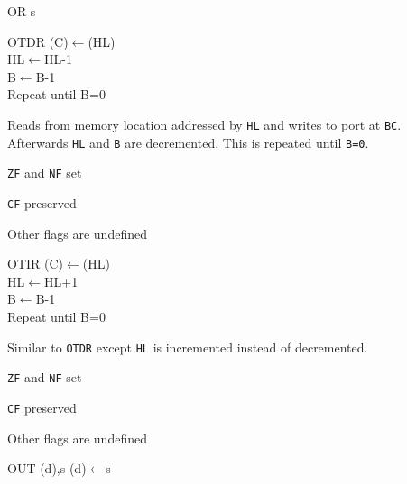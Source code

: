 \documentclass[twoside,openright,a4paper]{book}
\begin{document}
\begin{basedescript}{
	\desclabelstyle{\multilinelabel}
	\desclabelwidth{3cm}}
\begin{detailitem}{OR s}
	\end{detailitem}

	\begin{detailitem}{OTDR}
		{(C)$\leftarrow$(HL)\\
		HL$\leftarrow$HL-1\\
		B$\leftarrow$B-1\\
		Repeat until B=0}

		Reads from memory location addressed by {\tt HL} and writes to port at {\tt BC}. Afterwards {\tt HL} and {\tt B} are decremented. This is repeated until {\tt B=0}.

		\begin{DetailEffects}
			\item {\tt ZF} and {\tt NF} set
			\item {\tt CF} preserved
			\item Other flags are undefined
		\end{DetailEffects}
				
		\begin{DetailTiming}
		\end{DetailTiming}

	\end{detailitem}

	\pagebreak
	\begin{detailitem}{OTIR}
		{(C)$\leftarrow$(HL)\\
		HL$\leftarrow$HL+1\\
		B$\leftarrow$B-1\\
		Repeat until B=0}

		Similar to {\tt OTDR} except {\tt HL} is incremented instead of decremented.

		\begin{DetailEffects}
			\item {\tt ZF} and {\tt NF} set
			\item {\tt CF} preserved
			\item Other flags are undefined
		\end{DetailEffects}
				
		\begin{DetailTiming}
			\DetailTime{B=0}{4}{16}
			\DetailTime{B$\not=$0}{5}{21}
		\end{DetailTiming}

	\end{detailitem}

	\begin{detailitem}{OUT (d),s}
		{(d)$\leftarrow$s}


\end{detailitem}
\end{basedescript}
\end{document}

